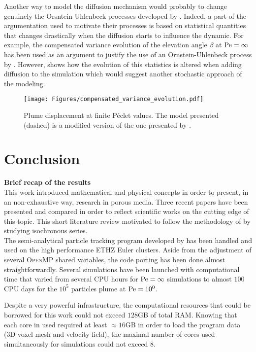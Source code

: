 Another way to model the diffusion mechanism would probably to change genuinely the Orsntein-Uhlenbeck processes developed by \citet{Meyer2016}. 
Indeed, a part of the argumentation used to motivate their processes is based on statistical quantities that changes drastically when the diffusion starts to influence the dynamic.
For example, the compensated variance evolution of the elevation angle $\beta$ at $\mathrm{Pe} = \infty$ has been used as an argument to justify the use of an Ornstein-Uhlenbeck process by \citet{Meyer2016}.
However,  shows how the evolution of this statistics is altered when adding diffusion to the simulation which would suggest another stochastic approach of the modeling.
\begin{figure}[h!]
	\centering
	\texttt{[image: Figures/compensated\_variance\_evolution.pdf]}
	\caption{Plume displacement at finite Péclet values. The model presented (dashed) is a modified version of the one presented by \citet{Meyer2016}.}
	\label{fig:compensated_variance_evolution}
\end{figure}

\chapter{Conclusion}

\textbf{Brief recap of the results}\\
This work introduced mathematical and physical concepts in order to present, in an non-exhaustive way, research in porous media.
Three recent papers have been presented and compared in order to reflect scientific works on the cutting edge of this topic.
This short literature review motivated to follow the methodology of \citet{Meyer2016} by studying isochronous series.\\
The semi-analytical particle tracking program developed by \citet{Meyer2017} has been handled and used on the high performance ETHZ Euler clusters.
Aside from the adjustment of several \textsc{OpenMP} shared variables, the code porting has been done almost straightforwardly.
Several simulations have been launched with computational time that varied from several CPU hours for $\mathrm{Pe}=\infty$ simulations to almost $100$ CPU days for the $10^5$ particles plume at $\mathrm{Pe}=10^0$.

Despite a very powerful infrastructure, the computational resources that could be borrowed for this work could not exceed $128$GB of total RAM. 
Knowing that each core in used required at least $\approx 16$GB in order to load the program data (3D voxel mesh and velocity field), the maximal number of cores used simultaneously for simulations could not exceed 8.

